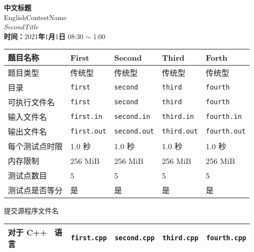 \documentclass[UTF8,a4paper]{ctexart}
\begin{document}
    \pagestyle{fancy}
     \rhead{}
    \thispagestyle{empty}
    \begin{center}
        \Huge
        \textbf{中文标题}
        \\
        \Huge 
        EnglishContestName
        \\
        \huge
        \textit{SecondTitle}
        \\
        \Large
        \textbf{时间：}2021\textbf{年}1\textbf{月}1\textbf{日} 08:30 $\sim$ 1:00
        \\
    \end{center}
    \large
    \begin{center}
        \begin{tabular}{|p{3.1cm}|p{2.5cm}|p{2.5cm}|p{2.5cm}|p{2.5cm}|}
        \hline
        题目名称 & First & Second & Third & Forth \\
        \hline
        题目类型 & 传统型 & 传统型 & 传统型 & 传统型 \\
        \hline
        目录 & \texttt{first} & \texttt{second} & \texttt{third} & \texttt{fourth} \\
        \hline
        可执行文件名 & \texttt{first} & \texttt{second} & \texttt{third} & \texttt{fourth} \\
        \hline
        输入文件名 & \texttt{first.in} & \texttt{second.in} & \texttt{third.in} & \texttt{fourth.in} \\
        \hline
        输出文件名 & \texttt{first.out} & \texttt{second.out} & \texttt{third.out} & \texttt{fourth.out} \\
        \hline
        每个测试点时限 & 1.0 秒 & 1.0 秒 & 1.0 秒 & 1.0 秒 \\
        \hline
        内存限制 & 256 MiB & 256 MiB & 256 MiB & 256 MiB \\
        \hline
        测试点数目 & 5 & 5 & 5 & 5 \\
        \hline
        测试点是否等分 & 是 & 是 & 是 & 是 \\
        \hline
        \end{tabular}
    \end{center}
提交源程序文件名
    \begin{center}
        \begin{tabular}{|p{3.1cm}|p{2.5cm}|p{2.5cm}|p{2.5cm}|p{2.5cm}|}
        \hline
        对于 C++ \  语言 & \texttt{first.cpp} & \texttt{second.cpp} & \texttt{third.cpp} & \texttt{fourth.cpp} \\
        \hline
        \end{tabular}
    \end{center}
\end{document}
